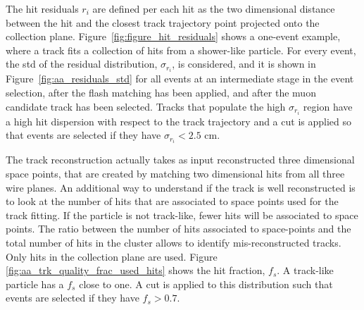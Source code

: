 The hit residuals $r_i$ are defined per each hit as the two dimensional distance between the hit and the closest track trajectory point projected onto the collection plane. Figure~\ref{fig:figure_hit_residuals} shows a one-event example, where a track fits a collection of hits from a shower-like particle. For every event, the \acrshort{std} of the residual distribution, $\sigma_{r_i}$, is considered, and it is shown in Figure~\ref{fig:aa_residuals_std} for all events at an intermediate stage in the event selection, after the flash matching has been applied, and after the muon candidate track has been selected. Tracks that populate the high $\sigma_{r_i}$ region have a high hit dispersion with respect to the track trajectory and a cut is applied so that events are selected if they have $\sigma_{r_i} < 2.5$ cm.

The track reconstruction actually takes as input reconstructed three dimensional space points, that are created by matching two dimensional hits from all three wire planes. An additional way to understand if the track is well reconstructed is to look at the number of hits that are associated to space points used for the track fitting. 
If the particle is not track-like, fewer hits will be associated to space points. The ratio between the number of hits associated to space-points and the total number of hits in the cluster allows to identify mis-reconstructed tracks. Only hits in the collection plane are used. Figure \ref{fig:aa_trk_quality_frac_used_hits} shows the hit fraction, $f_s$. A track-like particle has a $f_s$ close to one. A cut is applied to this distribution such that events are selected if they have $f_s > 0.7$.





